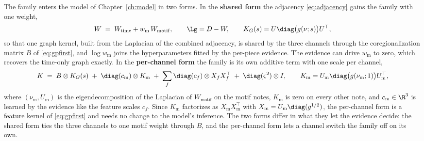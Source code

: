 The family enters the model of Chapter~\ref{ch:model} in two forms. In the
\textbf{shared form} the adjacency \eqref{eq:adjacency} gains the family
with one weight,
\begin{equation}
  W \;=\; W_{\mathrm{time}} + w_{\mathrm m}\, W_{\mathrm{motif}},
  \qquad \Lg = D - W,
  \qquad K_G(s) = U \diag\bigl(g(\nu; s)\bigr) U^{\top},
  \label{eq:motif-shared}
\end{equation}
so that one graph kernel, built from the Laplacian of the combined
adjacency, is shared by the three channels through the coregionalization
matrix $B$ of \eqref{eq:gpfirst}, and $\log w_{\mathrm m}$ joins the
hyperparameters fitted by the per-piece evidence. The evidence can drive
$w_{\mathrm m}$ to zero, which recovers the time-only graph exactly. In the
\textbf{per-channel form} the family is its own additive term with one
scale per channel,
\begin{equation}
  K \;=\; B \otimes K_G(s) \;+\; \diag(c_{\mathrm m}) \otimes K_{\mathrm m}
  \;+\; \sum_f \diag(c_f) \otimes X_f X_f^{\top}
  \;+\; \diag(\varsigma^2) \otimes I,
  \qquad K_{\mathrm m} = U_{\mathrm m} \diag\bigl(g(\nu_{\mathrm m}; 1)\bigr) U_{\mathrm m}^{\top},
  \label{eq:motif-pc}
\end{equation}
where $(\nu_{\mathrm m}, U_{\mathrm m})$ is the eigendecomposition of the
Laplacian of $W_{\mathrm{motif}}$ on the motif notes, $K_{\mathrm m}$ is zero
on every other note, and $c_{\mathrm m} \in \R^{3}$ is learned by the
evidence like the feature scales $c_f$. Since $K_{\mathrm m}$ factorizes as
$X_{\mathrm m} X_{\mathrm m}^{\top}$ with
$X_{\mathrm m} = U_{\mathrm m} \diag(g^{1/2})$, the per-channel form is a
feature kernel of \eqref{eq:gpfirst} and needs no change to the model's
inference. The two forms differ in what they let the evidence decide: the
shared form ties the three channels to one motif weight through $B$, and
the per-channel form lets a channel switch the family off on its own.

